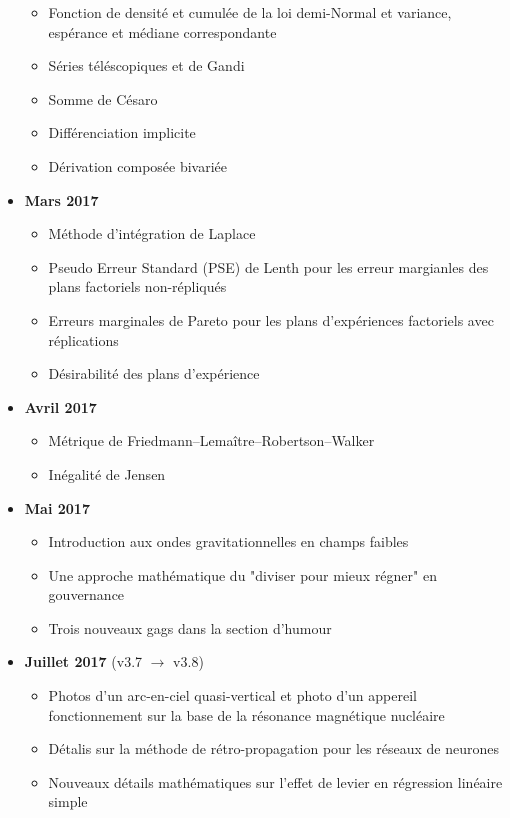 \begin{itemize}
\begin{itemize}[noitemsep]
				\item Fonction de densité et cumulée de la loi demi-Normal et variance, espérance et médiane correspondante
				\item Séries téléscopiques et de Gandi
				\item Somme de Césaro
				\item Différenciation implicite
				\item Dérivation composée bivariée
			\end{itemize}
		\item \textbf{Mars 2017}
			\begin{itemize}[noitemsep]
				\item Méthode d'intégration de Laplace
				\item Pseudo Erreur Standard (PSE) de Lenth pour les erreur margianles des plans factoriels non-répliqués
				\item Erreurs marginales de Pareto pour les plans d'expériences factoriels avec réplications
				\item Désirabilité des plans d'expérience
			\end{itemize}
		\item \textbf{Avril 2017}
			\begin{itemize}[noitemsep]
				\item Métrique de Friedmann–Lemaître–Robertson–Walker
				\item Inégalité de Jensen
			\end{itemize}
		\item \textbf{Mai 2017}
			\begin{itemize}[noitemsep]
				\item Introduction aux ondes gravitationnelles en champs faibles
				\item Une approche mathématique du "diviser pour mieux régner" en gouvernance
				\item Trois nouveaux gags dans la section d'humour
			\end{itemize}
		\item \textbf{Juillet 2017} (v3.7 $\rightarrow$ v3.8)
			\begin{itemize}[noitemsep]
				\item Photos d'un arc-en-ciel quasi-vertical et photo d'un appereil fonctionnement sur la base de la résonance magnétique nucléaire
				\item Détalis sur la méthode de rétro-propagation pour les réseaux de neurones
				\item Nouveaux détails mathématiques sur l'effet de levier en régression linéaire simple

\end{itemize}
\end{itemize}
